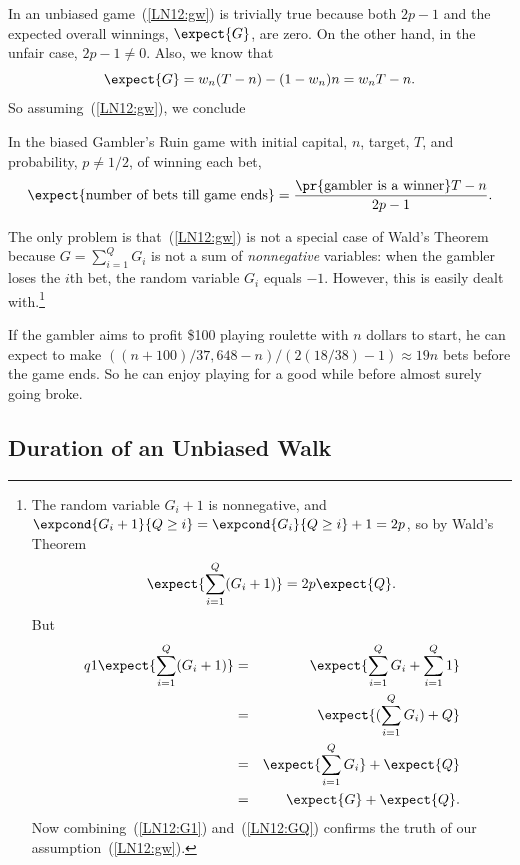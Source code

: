 \begin{editingnotes}
In an unbiased game~(\ref{LN12:gw}) is trivially true because both $2p-1$ and
the expected overall winnings, $\expect{G}$, are zero.  On the other hand,
in the unfair case, $2p-1 \neq 0$.  Also, we know that
\[
\expect{G} = w_n(T-n) - (1-w_n)n = w_nT-n.
\]
So assuming~(\ref{LN12:gw}), we conclude
\begin{theorem}\label{LN12:ExQthm}
In the biased Gambler's Ruin game with initial capital, $n$, target,
$T$, and probability, $p \neq 1/2$, of winning each bet,
\begin{equation}\label{LN12:ExQ}
\expect{\text{number of bets till game ends}} =
\frac{\pr{\text{gambler is a winner}}T-n}{2p-1}.
\end{equation}
\end{theorem}

The only problem is that~(\ref{LN12:gw}) is not a special case of Wald's
Theorem because $G = \sum_{i=1}^Q G_i$ is not a sum of \emph{nonnegative}
variables: when the gambler loses the $i$th bet, the random variable $G_i$
equals $-1$.  However, this is easily dealt with.\footnote{The random variable
$G_i+1$ is nonnegative, and $\expcond{G_i+1}{Q \geq i} =
\expcond{G_i}{Q\geq i}+1 = 2p$, so by Wald's Theorem
\begin{equation}\label{LN12:G1}
\expect{\sum_{i=1}^Q (G_i+1)}  = 2p\expect{Q}.
\end{equation}
But
\begin{eqnarray}q1
\expect{\sum_{i=1}^Q (G_i+1)} & = & \expect{\sum_{i=1}^Q G_i + \sum_{i=1}^Q 1}\notag\\
   & = & \expect{(\sum_{i=1}^Q G_i) + Q}\notag\\
   & = & \expect{\sum_{i=1}^Q G_i} + \expect{Q}\notag\\
   & = & \expect{G} + \expect{Q}\label{LN12:GQ}.
\end{eqnarray}
Now combining~(\ref{LN12:G1}) and~(\ref{LN12:GQ}) confirms the truth of our
assumption~(\ref{LN12:gw}).}

\begin{example}
If the gambler aims to profit \$100 playing roulette with $n$ dollars to
start, he can expect to make $((n+100)/37,648 - n)/(2(18/38) - 1) \approx
19n$ bets before the game ends.  So he can enjoy playing for a good while
before almost surely going broke.
\end{example}


\subsection{Duration of an Unbiased Walk}


\end{editingnotes}

